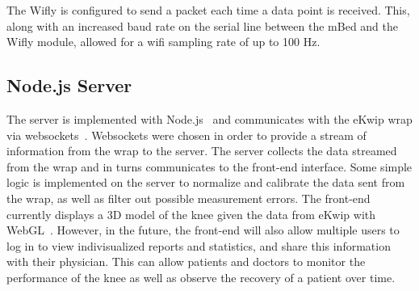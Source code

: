 The Wifly is configured to send a packet each time a data point is received. This, along with an increased baud rate on the serial line between the mBed and the Wifly module, allowed for a wifi sampling rate of up to 100 Hz.

\subsection {Node.js Server}
The server is implemented with Node.js~\cite{node} and communicates with the eKwip wrap via websockets~\cite{websockets}. Websockets were chosen in order to provide a stream of information from the wrap to the server. The server collects the data streamed from the wrap and in turns communicates to the front-end interface. Some simple logic is implemented on the server to normalize and calibrate the data sent from the wrap, as well as filter out possible measurement errors. The front-end currently displays a 3D model of the knee given the data from eKwip with WebGL~\cite{webgl}. However, in the future, the front-end will also allow multiple users to log in to view indivisualized reports and statistics, and share this information with their physician. This can allow patients and doctors to monitor the performance of the knee as well as observe the recovery of a patient over time.
